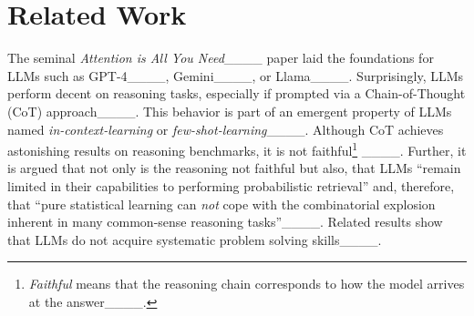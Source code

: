 \section{Related Work}
\label{sec:related-work}

The seminal \textit{Attention is All You Need}____ paper laid the foundations
for LLMs such as GPT-4____, Gemini____,
or Llama____.
%
Surprisingly, LLMs perform decent on reasoning tasks,
especially if prompted via a Chain-of-Thought (CoT) approach____.
This behavior is part of an emergent property of LLMs named \textit{in-context-learning}
or \textit{few-shot-learning}____.
Although CoT achieves astonishing results on reasoning benchmarks,
it is not faithful\footnote{
\textit{Faithful} means that the reasoning chain corresponds to how the model arrives at the answer____.}
____.
Further, it is argued that not only is the reasoning not faithful
but also, that LLMs ``remain limited in their capabilities to performing probabilistic retrieval'' 
and, therefore, that ``pure statistical learning can \textit{not} cope with the combinatorial explosion inherent in many common-sense reasoning tasks''____.
Related results show that LLMs do not
acquire systematic problem solving skills____.
%
%
%
%

